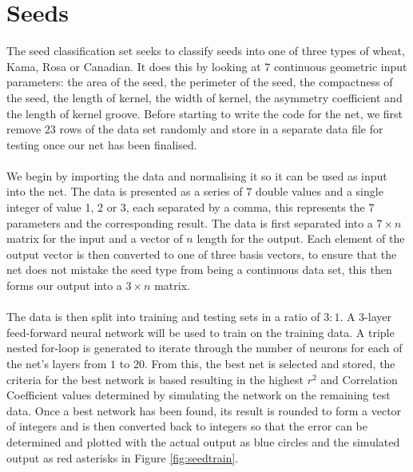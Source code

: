 \documentclass{article}%
\begin{document}
\section{Seeds}
The seed classification set seeks to classify seeds into one of three types of wheat, Kama, Rosa or Canadian. It does this by looking at 7 continuous geometric input parameters: the area of the seed, the perimeter of the seed, the compactness of the seed, the length of kernel, the width of kernel, the asymmetry coefficient and the length of kernel groove. Before starting to write the code for the net, we first remove $23$ rows of the data set randomly and store in a separate data file for testing once our net has been finalised.
\\
\\
We begin by importing the data and normalising it so it can be used as input into the net. The data is presented as a series of $7$ double values and a single integer of value 1, 2 or 3, each separated by a comma, this represents the $7$ parameters and the corresponding result. The data is first separated into a $7 \times n$ matrix for the input and a vector of $n$ length for the output. Each element of the output vector is then converted to one of three basis vectors, to ensure that the net does not mistake the seed type from being a continuous data set, this then forms our output into a $3 \times n$ matrix.
\\
\\
The data is then split into training and testing sets in a ratio of $3:1$. A 3-layer feed-forward neural network will be used to train on the training data. A triple nested for-loop is generated to iterate through the number of neurons for each of the net's layers from $1$ to $20$. From this, the best net is selected and stored, the criteria for the best network is based resulting in the highest $r^2$ and Correlation Coefficient values determined by simulating the network on the remaining test data. Once a best network has been found, its result is rounded to form a vector of integers and is then converted back to integers so that the error can be determined and plotted with the actual output as blue circles and the simulated output as red asterisks in Figure \ref{fig:seedtrain}.
\end{document}
